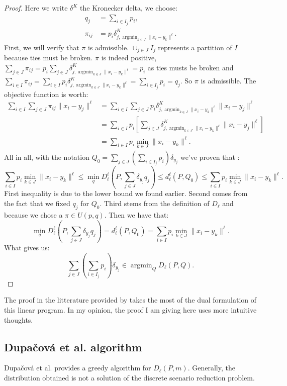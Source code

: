 \documentclass{amsart}
\newcommand{\argmin}{\mathop{\arg\min}}
\begin{document}
\begin{proof}
Here we write $\delta^K$ the Kronecker delta, we choose: 
\begin{align*}
    q_j&=\sum_{i\in I_j}p_i, \\
    \pi_{ij}&=p_i\delta^K_{j,\argmin_{k\in J}\lVert x_i-y_k\rVert^\ell}.
\end{align*}
First, we will verify that $\pi$ is admissible. $\cup_{j\in J}I_j$ represents a partition of $I$ because ties must be broken. $\pi$ is indeed positive, $\sum_{j\in J}\pi_{ij}=p_i\sum_{j\in J}\delta^K_{j,\argmin_{k\in J}\lVert x_i-y_k\rVert^\ell}=p_i$ as ties musts be broken and $\sum_{i\in I}\pi_{ij}=\sum_{i\in I}p_i\delta^K_{j,\argmin_{k\in J}\lVert x_i-y_k\rVert^\ell}=\sum_{i\in I_j}p_i=q_j$. So $\pi$ is admissible. The objective function is worth: 
\begin{align*}
    \sum_{i\in I}\sum_{j\in J}\pi_{ij}\lVert x_i-y_j\rVert^\ell &=\sum_{i\in I}\sum_{j\in J}p_i\delta^K_{j, \argmin_{k\in J}\lVert x_i-y_k\rVert^\ell}\lVert x_i-y_j\rVert^\ell \\ &=\sum_{i\in I}p_i\left[\sum_{j\in J}\delta^K_{j, \argmin_{k\in J}\lVert x_i-y_k\rVert^\ell}\lVert x_i-y_j\rVert^\ell\right] \\ &=\sum_{i\in I}p_i\min_{k\in J}\lVert x_i-y_k\rVert^\ell.
\end{align*}
All in all, with the notation $Q_0=\sum_{j\in J}\left(\sum_{i\in I_j}p_i\right)\delta_{y_j}$ we've proven that :
$$
\sum_{i\in I}p_i\min_{k\in J}\lVert x_i-y_k\rVert ^\ell\leq \min_{q} D_\ell^\ell\left(P,\sum_{j\in J}\delta_{y_j}q_j\right)\leq d_\ell^\ell\left(P,Q_0\right) \leq \sum_{i\in I}p_i\min_{k\in J}\lVert x_i-y_k\rVert ^\ell.
$$
First inequality is due to the lower bound we found earlier. Second comes from the fact that we fixed $q_j$ for $Q_0$. Third stems from the definition of $D_\ell$ and because we chose a $\pi\in U\left(p,q\right)$. Then we have that:
$$
\min_{q} D_\ell^\ell\left(P,\sum_{j\in J}\delta_{y_j}q_j\right)= d_\ell^\ell\left(P,Q_0\right)= \sum_{i\in I}p_i\min_{k\in J}\lVert x_i-y_k\rVert ^\ell.
$$
What gives us:
$$\sum_{j\in J}\left(\sum_{i\in I_j}p_i\right)\delta_{y_j}\in \argmin_Q D_\ell\left(P,Q\right).$$
\end{proof}
\begin{remark}
    The proof in the litterature provided by \cite{dupacova_scenario_2003} takes the most of the dual formulation of this linear program. In my opinion, the proof I am giving here uses more intuitive thoughts.
\end{remark}

\subsection{Dupačová et al. algorithm}
Dupačová et al. \cite{dupacova_scenario_2003} provides a greedy algorithm for $D_\ell\left(P,m\right)$. Generally, the distribution obtained is not a solution of the discrete scenario reduction problem. 
\end{document}
